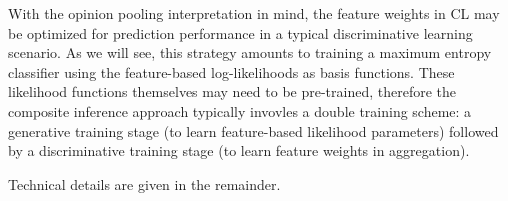 \documentclass[english]{scrartcl}
\begin{document}

With the opinion pooling interpretation in mind, the feature weights in CL may be optimized for prediction performance in a typical discriminative learning scenario. As we will see, this strategy amounts to training a maximum entropy classifier using the feature-based log-likelihoods as basis functions. These likelihood functions themselves may need to be pre-trained, therefore the composite inference approach typically invovles a double training scheme: a generative training stage (to learn feature-based likelihood parameters) followed by a discriminative training stage (to learn feature weights in aggregation).

Technical details are given in the remainder.






\end{document}
